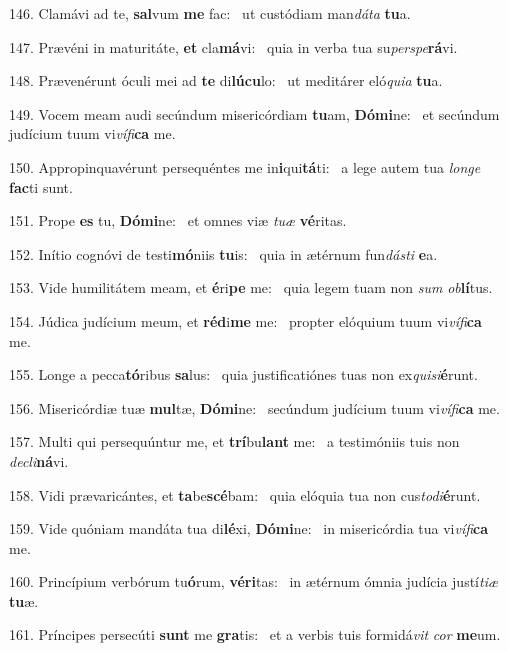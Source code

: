 146. Clamávi ad te, \textbf{sal}vum \textbf{me} fac: \ast\  ut custódiam man\textit{dá}\textit{ta} \textbf{tu}a.\

147. Prævéni in maturitáte, \textbf{et} cla\textbf{má}vi: \ast\  quia in verba tua su\textit{per}\textit{spe}\textbf{rá}vi.\

148. Prævenérunt óculi mei ad \textbf{te} di\textbf{lú}\textbf{cu}lo: \ast\  ut meditárer eló\textit{qui}\textit{a} \textbf{tu}a.\

149. Vocem meam audi secúndum misericórdiam \textbf{tu}am, \textbf{Dó}\textbf{mi}ne: \ast\  et secúndum judícium tuum vi\textit{ví}\textit{fi}\textbf{ca} me.\

150. Appropinquavérunt persequéntes me in\textbf{i}qui\textbf{tá}ti: \ast\  a lege autem tua \textit{lon}\textit{ge} \textbf{fac}ti sunt.\

151. Prope \textbf{es} tu, \textbf{Dó}\textbf{mi}ne: \ast\  et omnes viæ \textit{tu}\textit{æ} \textbf{vé}ritas.\

152. Inítio cognóvi de testi\textbf{mó}niis \textbf{tu}is: \ast\  quia in ætérnum fun\textit{dás}\textit{ti} \textbf{e}a.\

153. Vide humilitátem meam, et \textbf{é}ri\textbf{pe} me: \ast\  quia legem tuam non \textit{sum} \textit{ob}\textbf{lí}tus.\

154. Júdica judícium meum, et \textbf{réd}i\textbf{me} me: \ast\  propter elóquium tuum vi\textit{ví}\textit{fi}\textbf{ca} me.\

155. Longe a pecca\textbf{tó}ribus \textbf{sa}lus: \ast\  quia justificatiónes tuas non ex\textit{qui}\textit{si}\textbf{é}runt.\

156. Misericórdiæ tuæ \textbf{mul}tæ, \textbf{Dó}\textbf{mi}ne: \ast\  secúndum judícium tuum vi\textit{ví}\textit{fi}\textbf{ca} me.\

157. Multi qui persequúntur me, et \textbf{trí}bu\textbf{lant} me: \ast\  a testimóniis tuis non \textit{de}\textit{cli}\textbf{ná}vi.\

158. Vidi prævaricántes, et \textbf{ta}be\textbf{scé}bam: \ast\  quia elóquia tua non cus\textit{to}\textit{di}\textbf{é}runt.\

159. Vide quóniam mandáta tua di\textbf{lé}xi, \textbf{Dó}\textbf{mi}ne: \ast\  in misericórdia tua vi\textit{ví}\textit{fi}\textbf{ca} me.\

160. Princípium verbórum tu\textbf{ó}rum, \textbf{vé}\textbf{ri}tas: \ast\  in ætérnum ómnia judícia justí\textit{ti}\textit{æ} \textbf{tu}æ.\

161. Príncipes persecúti \textbf{sunt} me \textbf{gra}tis: \ast\  et a verbis tuis formidá\textit{vit} \textit{cor} \textbf{me}um.\

